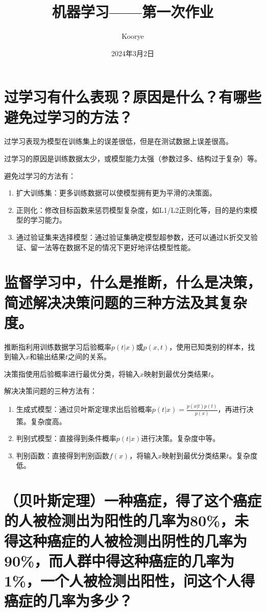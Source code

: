 \documentclass{article}
\title{机器学习——第一次作业}
\author{Koorye}
\date{2024年3月2日}
\begin{document}
\maketitle
\thispagestyle{fancy}

\section{过学习有什么表现？原因是什么？有哪些避免过学习的方法？}

过学习表现为模型在训练集上的误差很低，但是在测试数据上误差很高。

过学习的原因是训练数据太少，或模型能力太强（参数过多、结构过于复杂）等。

避免过学习的方法有：
\begin{enumerate}
    \item 扩大训练集：更多训练数据可以使模型拥有更为平滑的决策面。
    \item 正则化：修改目标函数来惩罚模型复杂度，如L1/L2正则化等，目的是约束模型的学习能力。
    \item 通过验证集来选择模型：通过验证集确定模型超参数，还可以通过K折交叉验证、留一法等在数据不足的情况下更好地评估模型性能。
\end{enumerate}

\section{监督学习中，什么是推断，什么是决策，简述解决决策问题的三种方法及其复杂度。}

推断指利用训练数据学习后验概率$p(t|x)$或$p(x,t)$，使用已知类别的样本，找到输入$x$和输出结果$t$之间的关系。

决策指使用后验概率进行最优分类，将输入$x$映射到最优分类结果$t$。

解决决策问题的三种方法有：
\begin{enumerate}
    \item 生成式模型：通过贝叶斯定理求出后验概率$p(t|x)=\frac{p(x|t)p(t)}{p(x)}$，再进行决策。复杂度高。
    \item 判别式模型：直接得到条件概率$p(t|x)$进行决策。复杂度中等。
    \item 判别函数：直接得到判别函数$f(x)$，将输入$x$映射到最优分类结果$t$。复杂度低。
\end{enumerate}

\section{（贝叶斯定理）一种癌症，得了这个癌症的人被检测出为阳性的几率为80\%，未得这种癌症的人被检测出阴性的几率为90\%，而人群中得这种癌症的几率为1\%，一个人被检测出阳性，问这个人得癌症的几率为多少？}
\end{document}
